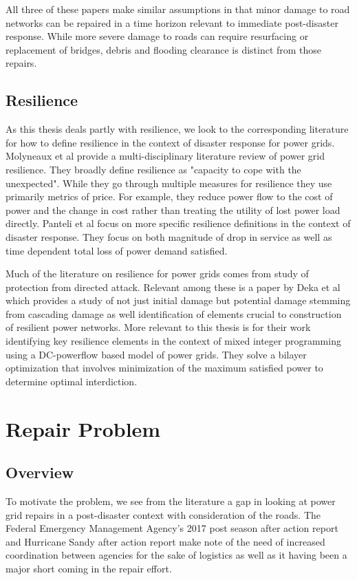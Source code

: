 \documentclass{article}
\begin{document}
		All three of these papers make similar assumptions in that minor damage to road networks can be repaired in a time horizon relevant to immediate post-disaster response. While more severe damage to roads can require resurfacing or replacement of bridges, debris and flooding clearance is distinct from those repairs.
	
	\subsection{Resilience}
		As this thesis deals partly with resilience, we look to the corresponding literature for how to define resilience in the context of disaster response for power grids. Molyneaux et al provide\cite{MolyneauxEA2016} a multi-disciplinary literature review of power grid resilience. They broadly define resilience as "capacity to cope with the unexpected". While they go through multiple measures for resilience they use primarily metrics of price. For example, they reduce power flow to the cost of power and the change in cost rather than treating the utility of lost power load directly. Panteli et al \cite{Panteli2017} focus on more specific resilience definitions in the context of disaster response. They focus on both magnitude of drop in service as well as time dependent total loss of power demand satisfied.
		
		Much of the literature on resilience for power grids comes from study of protection from directed attack. Relevant among these is a paper by Deka et al \cite{Deka2018} which provides a study of not just initial damage but potential damage stemming from cascading damage as well identification of elements crucial to construction of resilient power networks. More relevant to this thesis is \cite{Salmeron2004} for their work identifying key resilience elements in the context of mixed integer programming using a DC-powerflow based model of power grids. They solve a bilayer optimization that involves minimization of the maximum satisfied power to determine optimal interdiction.


	
	\section{Repair Problem}
	
	\subsection{Overview}
	To motivate the problem, we see from the literature a gap in looking at power grid repairs in a post-disaster context with consideration of the roads. The Federal Emergency Management Agency's 2017 post season after action report\cite{FEMA2017AAR}  and Hurricane Sandy after action report \cite{FEMASandyAAR} make note of the need of increased coordination between agencies for the sake of logistics as well as it having been a major short coming in the repair effort.
	
\end{document}
